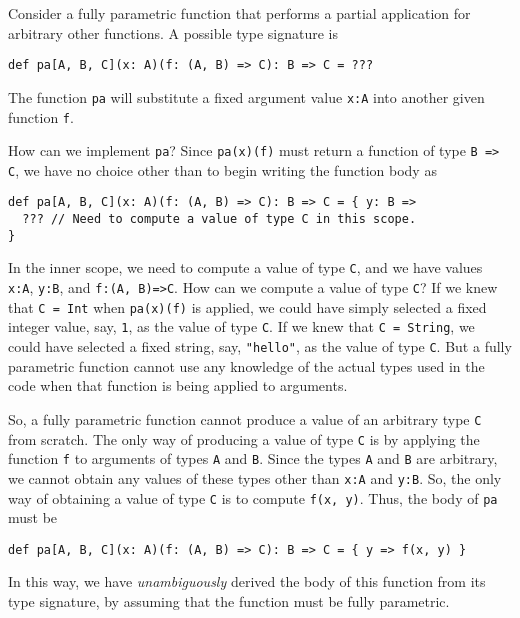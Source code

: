 Consider a fully parametric function that performs a partial application
for arbitrary other functions. A possible type signature is
\begin{lstlisting}
def pa[A, B, C](x: A)(f: (A, B) => C): B => C = ???
\end{lstlisting}
The function \lstinline!pa! will substitute a fixed argument value
\lstinline!x:A! into another given function \lstinline!f!. 

How can we implement \lstinline!pa!? Since \lstinline!pa(x)(f)!
must return a function of type \lstinline!B => C!, we have no choice
other than to begin writing the function body as
\begin{lstlisting}
def pa[A, B, C](x: A)(f: (A, B) => C): B => C = { y: B =>
  ??? // Need to compute a value of type C in this scope.
}
\end{lstlisting}
In the inner scope, we need to compute a value of type \lstinline!C!,
and we have values \lstinline!x:A!, \lstinline!y:B!, and \lstinline!f:(A, B)=>C!.
How can we compute a value of type \lstinline!C!? If we knew that
\lstinline!C = Int! when \lstinline!pa(x)(f)! is applied, we could
have simply selected a fixed integer value, say, \lstinline!1!, as
the value of type \lstinline!C!. If we knew that \lstinline!C = String!,
we could have selected a fixed string, say, \lstinline!"hello"!,
as the value of type \lstinline!C!. But a fully parametric function
cannot use any knowledge of the actual types used in the code when
that function is being applied to arguments.

So, a fully parametric function cannot produce a value of an arbitrary
type \lstinline!C! from scratch. The only way of producing a value
of type \lstinline!C! is by applying the function \lstinline!f!
to arguments of types \lstinline!A! and \lstinline!B!. Since the
types \lstinline!A! and \lstinline!B! are arbitrary, we cannot obtain
any values of these types other than \lstinline!x:A! and \lstinline!y:B!.
So, the only way of obtaining a value of type \lstinline!C! is to
compute \lstinline!f(x, y)!. Thus, the body of \lstinline!pa! must
be
\begin{lstlisting}
def pa[A, B, C](x: A)(f: (A, B) => C): B => C = { y => f(x, y) }
\end{lstlisting}
In this way, we have \emph{unambiguously} derived the body of this
function from its type signature, by assuming that the function must
be fully parametric.

